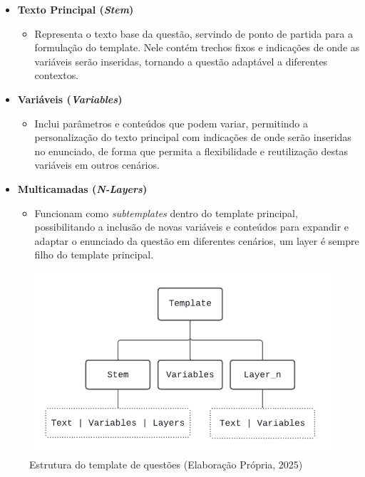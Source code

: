\begin{itemize} \item \textbf{Texto Principal (\textit{Stem})} \begin{itemize} \item Representa o texto base da questão, servindo de ponto de partida para a formulação do template. Nele contém trechos fixos e indicações de onde as variáveis serão inseridas, tornando a questão adaptável a diferentes contextos. \end{itemize}
\item \textbf{Variáveis (\textit{Variables})}
\begin{itemize}
    \item Inclui parâmetros e conteúdos que podem variar, permitindo a personalização do texto principal com indicações de onde serão inseridas no enunciado, de forma que permita a flexibilidade e reutilização destas variáveis em outros cenários.
\end{itemize}

\item \textbf{Multicamadas (\textit{N-Layers})}
\begin{itemize}
    \item Funcionam como \textit{subtemplates} dentro do template principal, possibilitando a inclusão de novas variáveis e conteúdos para expandir e adaptar o enunciado da questão em diferentes cenários, um layer é sempre filho do template principal.
    \end{itemize}
\end{itemize}


\begin{figure}[ht]
	\centering
	\includegraphics[width=14cm]{./imagens/capitulo5/template-json-example-1}
	\caption{Estrutura do template de questões (Elaboração Própria, 2025) }
	\label{fig:template-json-example-1}
\end{figure}


